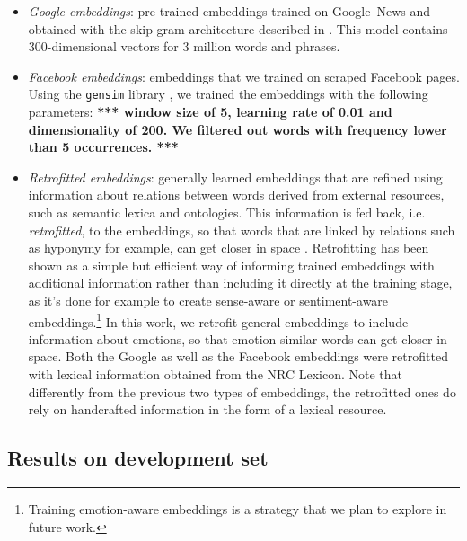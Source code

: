 \documentclass[11pt]{article}
\newcommand{\note}[1]{\textbf{*** #1 ***}}
\begin{document}
\begin{itemize} 

\item \textit{Google embeddings}: pre-trained embeddings trained on Google~News and obtained with the skip-gram architecture described in  \cite{mikolov2013distributed}. This model contains 300-dimensional vectors for 3 million words and phrases.

\item \textit{Facebook embeddings}: embeddings that we trained on scraped Facebook pages. Using the \texttt{gensim} library \cite{gensim}, we trained the embeddings with the following parameters: \note{window size of 5, learning rate of 0.01 and dimensionality of 200. We filtered out words with frequency lower than 5 occurrences.}

\item \textit{Retrofitted embeddings}: generally learned embeddings that are refined using information about relations between words derived from external resources, such as semantic lexica and ontologies. This information is fed back, i.e. \textit{retrofitted}, to the embeddings, so that words that are linked by relations such as hyponymy for example, can get closer in space \cite{retrofitting}. Retrofitting has been shown as a simple but efficient way of informing trained embeddings with additional information rather than including it directly at the training stage, as it's done for example to create sense-aware \cite{iacobacci2015sensembed} or sentiment-aware \cite{tang:14} embeddings.\footnote{Training emotion-aware embeddings is a strategy that we plan to explore in future work.} In this work, we retrofit general embeddings to include information about emotions, so that emotion-similar words can get closer in space. Both the Google as well as the Facebook embeddings were retrofitted with lexical information obtained from the NRC Lexicon. Note that differently from the previous two types of embeddings, the retrofitted ones do rely on handcrafted information in the form of a lexical resource.




\end{itemize}

\subsection{Results on development set}
\end{document}
